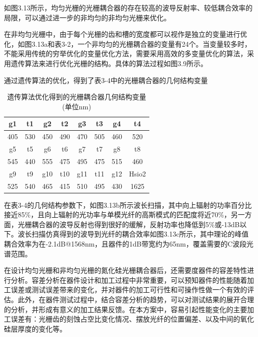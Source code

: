 如图3.13所示，均匀光栅的光栅耦合器的存在较高的波导反射率、较低耦合效率的局限，可以通过进一步的非均匀的非均匀光栅来优化。

在非均匀光栅中，由于每个光栅的齿和槽的宽度都可以视作是独立的变量进行优化，如图3.13a和表3-2，一个非均匀的光栅耦合器的变量有24个。当变量较多时，不能采用传统的穷举优化的变量优化方法，需要采用高效的多变量优化的算法，采用遗传算法来进行优化光栅的结构。具体的算法过程如图3.9所示。

通过遗传算法的优化，得到了表3-4中的光栅耦合器的几何结构变量


\begin{table}[!htbp]
    \caption{遗传算法优化得到的光栅耦合器几何结构变量(单位nm)}
    \label{tab:2}
    \centering
    \footnotesize%
    \setlength{\tabcolsep}{4pt}%
    \renewcommand{\arraystretch}{1.2}%
\begin{tabular}{cccccccc}
g1  & t1  & g2  & t2  & g3  & t3  & g4  & t4    \\ \hline
405 & 530 & 450 & 490 & 470 & 505 & 460 & 520   \\
g5  & t5  & g6  & t6  & g7  & t7  & g8  & t8    \\ \hline
545 & 440 & 555 & 475 & 495 & 475 & 515 & 460   \\
g9  & t9  & g10 & t10 & g11 & t11 & g12 & Hsio2 \\ \hline
525 & 540 & 465 & 415 & 510 & 495 & 430 & 1625 
\end{tabular}
\end{table}

在表3-4的几何结构参数下，如图3.13b所示波长扫描，其中向上辐射的功率百分比接近85\%，且向上辐射的光功率与单模光纤的高斯模式的匹配度将近70\%，另一方面，光栅耦合器的波导反射也得到很好的缓解，反射功率也降低到5\%或-13dB以下。波长扫描仿真得到的波导到光纤的耦合效率如图3.13c所示，其中理论的峰值耦合效率为在-2.1dB@1568nm，且器件的1dB带宽约为65nm，覆盖需要的C波段光谱范围。

在设计均匀光栅和非均匀光栅的氮化硅光栅耦合器后，还需要度器件的容差特性进行分析。容差分析在器件设计和加工过程中非常重要，可以预知器件的性能随着加工误差或测试误差带来的变化，并对器件的加工可行性和可操作性做一个有效的评估。此外，在器件测试过程中，结合容差分析的趋势，可以对测试结果的展开合理的分析，并形成有意义的加工结果反馈。在本方案中，容易引起性能变化的主要加工误差有：光栅齿的刻蚀占空比变化情况、摆放光纤的位置偏差、以及中间的氧化硅层厚度的变化等。

